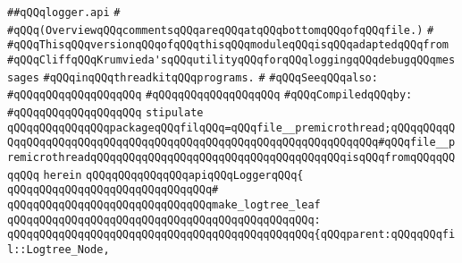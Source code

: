 \label{src/lib/src/lib/thread-kit/src/lib/logger.api}
\verb|##qQQqlogger.api|\newline
\verb|#|\newline
\verb|#qQQq(OverviewqQQqcommentsqQQqareqQQqatqQQqbottomqQQqofqQQqfile.)|\newline
\verb|#|\newline
\verb|#qQQqThisqQQqversionqQQqofqQQqthisqQQqmoduleqQQqisqQQqadaptedqQQqfrom|\newline
\verb|#qQQqCliffqQQqKrumvieda'sqQQqutilityqQQqforqQQqloggingqQQqdebugqQQqmessages|\newline
\verb|#qQQqinqQQqthreadkitqQQqprograms.|\newline
\verb|#|\newline
\verb|#qQQqSeeqQQqalso:|\newline
\verb|#qQQqqQQqqQQqqQQqqQQq|\newline
\verb|#qQQqqQQqqQQqqQQqqQQq|\newline
\newline
\verb|#qQQqCompiledqQQqby:|\newline
\verb|#qQQqqQQqqQQqqQQqqQQq|\newline
\newline
\newline
\verb|stipulate|\newline
\verb|qQQqqQQqqQQqqQQqpackageqQQqfilqQQq=qQQqfile__premicrothread;qQQqqQQqqQQqqQQqqQQqqQQqqQQqqQQqqQQqqQQqqQQqqQQqqQQqqQQqqQQqqQQqqQQq#qQQqfile__premicrothreadqQQqqQQqqQQqqQQqqQQqqQQqqQQqqQQqqQQqqQQqisqQQqfromqQQqqQQqqQQq|\newline
\verb|herein|\newline
\newline
\verb|qQQqqQQqqQQqqQQqapiqQQqLoggerqQQq{|\newline
\verb|qQQqqQQqqQQqqQQqqQQqqQQqqQQqqQQq#|\newline
\verb|qQQqqQQqqQQqqQQqqQQqqQQqqQQqqQQqmake_logtree_leaf|\newline
\verb|qQQqqQQqqQQqqQQqqQQqqQQqqQQqqQQqqQQqqQQqqQQqqQQq:|\newline
\verb|qQQqqQQqqQQqqQQqqQQqqQQqqQQqqQQqqQQqqQQqqQQqqQQq{qQQqparent:qQQqqQQqfil::Logtree_Node,|\newline
